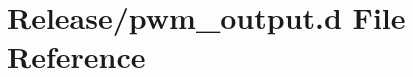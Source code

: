 \hypertarget{pwm__output_8d}{}\section{Release/pwm\+\_\+output.d File Reference}
\label{pwm__output_8d}
